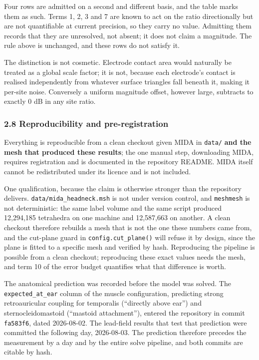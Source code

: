 \documentclass[
  11pt,
  a4paper,
]{article}
\begin{document}
Four rows are admitted on a second and different basis, and the table marks them
as such. Terms 1, 2, 3 and 7 are known to act on the ratio directionally but are
not quantifiable at current precision, so they carry no value. Admitting them
records that they are unresolved, not absent; it does not claim a
magnitude. The rule above is unchanged, and these rows do not satisfy it.

The distinction is not cosmetic. Electrode contact area would naturally be
treated as a global scale factor; it is not, because each electrode's contact is
realised independently from whatever surface triangles fall beneath it, making
it per-site noise. Conversely a uniform magnitude offset, however large,
subtracts to exactly 0 dB in any site ratio.

\subsubsection{2.8 Reproducibility and pre-registration}\label{reproducibility-and-pre-registration}

Everything is reproducible from a clean checkout given MIDA in \texttt{data/} \textbf{and the mesh that produced these results}; the one
manual step, downloading MIDA, requires registration and is documented in the
repository README. MIDA itself cannot be redistributed under its licence and is
not included.

One qualification, because the claim is otherwise stronger than the repository
delivers. \texttt{data/mida\_headneck.msh} is not under version control, and \texttt{meshmesh}
is not deterministic: the same label volume and the same script produced
12,294,185 tetrahedra on one machine and 12,587,663 on another. A clean checkout
therefore rebuilds a mesh that is not the one these numbers came from, and the
cut-plane guard in \texttt{config.cut\_plane()} will refuse it by design, since the
plane is fitted to a specific mesh and verified by hash. Reproducing the
pipeline is possible from a clean checkout; reproducing these exact values needs
the mesh, and term 10 of the error budget quantifies what that difference is
worth.

The anatomical prediction was recorded before the model was solved. The
\texttt{expected\_at\_ear} column of the muscle configuration, predicting strong
retroauricular coupling for temporalis (``directly above ear'') and
sternocleidomastoid (``mastoid attachment''), entered the repository in commit
\texttt{fa583f6}, dated 2026-08-02. The lead-field results that test that prediction
were committed the following day, 2026-08-03. The prediction therefore precedes
the measurement by a day and by the entire solve pipeline, and both commits are
citable by hash.
\end{document}
